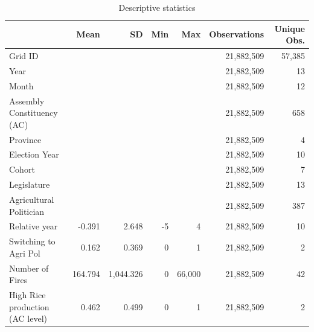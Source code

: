 \begin{table}[!h]
\centering
\caption{Descriptive statistics}
\label{app_desc_10_5km_protest}
\begin{tabular}{lrrrrrr}
\toprule
 & Mean & SD & Min & Max & Observations & Unique Obs.\\
\midrule
Grid ID &  &  &  &  & 21,882,509 & 57,385\\
Year &  &  &  &  & 21,882,509 & 13\\
Month &  &  &  &  & 21,882,509 & 12\\
Assembly Constituency (AC) &  &  &  &  & 21,882,509 & 658\\
Province &  &  &  &  & 21,882,509 & 4\\
Election Year &  &  &  &  & 21,882,509 & 10\\
Cohort &  &  &  &  & 21,882,509 & 7\\
Legislature &  &  &  &  & 21,882,509 & 13\\
Agricultural Politician &  &  &  &  & 21,882,509 & 387\\
Relative year & -0.391 & 2.648 & -5 & 4 & 21,882,509 & 10\\
Switching to Agri Pol & 0.162 & 0.369 & 0 & 1 & 21,882,509 & 2\\
Number of Fires & 164.794 & 1,044.326 & 0 & 66,000 & 21,882,509 & 42\\
High Rice production (AC level) & 0.462 & 0.499 & 0 & 1 & 21,882,509 & 2\\
\bottomrule
\end{tabular}
\end{table}
